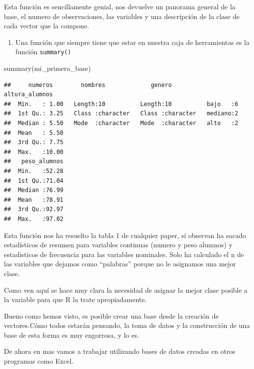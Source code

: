 \documentclass[
]{book}
\newenvironment{Shaded}{\begin{snugshade}}{\end{snugshade}}
\newcommand{\FunctionTok}[1]{\textcolor[rgb]{0.00,0.00,0.00}{#1}}
\newcommand{\NormalTok}[1]{#1}
\providecommand{\tightlist}{%
  \setlength{\itemsep}{0pt}\setlength{\parskip}{0pt}}
\begin{document}
Esta función es sencillamente genial, nos devuelve un panorama general de la base, el numero de observaciones, las variables y una descripción de la clase de cada vector que la compone.

\begin{enumerate}
\def\labelenumi{\arabic{enumi}.}
\setcounter{enumi}{3}
\tightlist
\item
  Una función que siempre tiene que estar en nuestra caja de herramientas es la función \texttt{summary()}
\end{enumerate}

\begin{Shaded}
\begin{Highlighting}[]
\FunctionTok{summary}\NormalTok{(mi\_primera\_base)}
\end{Highlighting}
\end{Shaded}

\begin{verbatim}
##     numeros        nombres             genero          altura_alumnos
##  Min.   : 1.00   Length:10          Length:10          bajo   :6     
##  1st Qu.: 3.25   Class :character   Class :character   mediano:2     
##  Median : 5.50   Mode  :character   Mode  :character   alto   :2     
##  Mean   : 5.50                                                       
##  3rd Qu.: 7.75                                                       
##  Max.   :10.00                                                       
##   peso_alumnos  
##  Min.   :52.28  
##  1st Qu.:71.04  
##  Median :76.99  
##  Mean   :78.91  
##  3rd Qu.:92.97  
##  Max.   :97.02
\end{verbatim}

Esta función nos ha resuelto la tabla 1 de cualquier paper, si observan ha sacado estadísticos de resumen para variables continuas (numero y peso alumnos) y estadisticos de frecuencia para las variables nominales. Solo ha calculado el n de las variables que dejamos como ``palabras'' porque no le asignamos una mejor clase.

Como ven aquí se hace muy clara la necesidad de asignar la mejor clase posible a la variable para que R la trate apropiadamente.

Bueno como hemos visto, es posible crear una base desde la creación de vectores.Cómo todos estarán pensando, la toma de datos y la construcción de una base de esta forma es muy engorrosa, y lo es.

De ahora en mas vamos a trabajar utilizando bases de datos creadas en otros programas como Excel.
\end{document}
